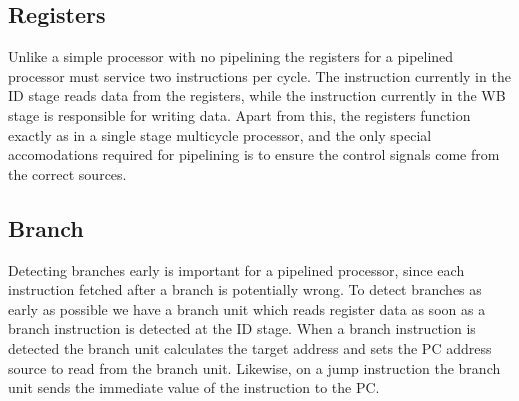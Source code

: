 \subsection{Registers}
Unlike a simple processor with no pipelining the registers for a pipelined processor must service two instructions per cycle.
The instruction currently in the ID stage reads data from the registers, while the instruction currently in the WB stage is responsible for writing data.
Apart from this, the registers function exactly as in a single stage multicycle processor, and the only special accomodations required for pipelining is to ensure the control signals come from the correct sources.

\subsection{Branch}
\label{sec:branch}
Detecting branches early is important for a pipelined processor, since each instruction fetched after a branch is potentially wrong.
To detect branches as early as possible we have a branch unit which reads register data as soon as a branch instruction is detected at the ID stage.
When a branch instruction is detected the branch unit calculates the target address and sets the PC address source to read from the branch unit.
Likewise, on a jump instruction the branch unit sends the immediate value of the instruction to the PC.

